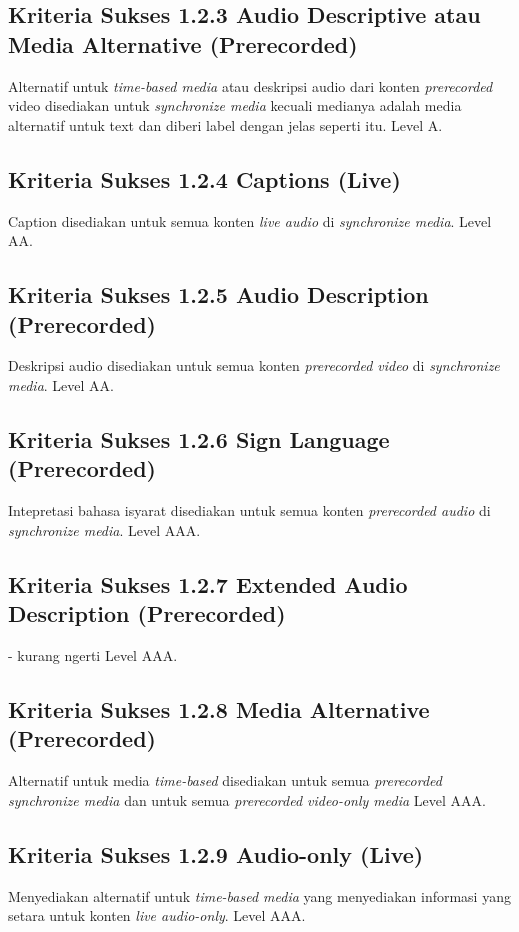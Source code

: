 \subsection{Kriteria Sukses 1.2.3 Audio Descriptive atau Media Alternative (Prerecorded)}
\label{sec:kriteria_1.2.3}
Alternatif untuk \textit{time-based media} atau deskripsi audio dari konten \textit{prerecorded} video disediakan untuk \textit{synchronize media} kecuali medianya adalah media alternatif untuk text dan diberi label dengan jelas seperti itu.
Level A.

\subsection{Kriteria Sukses 1.2.4 Captions (Live)}
\label{sec:kriteria_1.2.4}
Caption disediakan untuk semua konten \textit{live audio} di \textit{synchronize media}.
Level AA.

\subsection{Kriteria Sukses 1.2.5 Audio Description (Prerecorded)}
\label{sec:kriteria_1.2.5}
Deskripsi audio disediakan untuk semua konten \textit{prerecorded video} di \textit{synchronize media}.
Level AA.

\subsection{Kriteria Sukses 1.2.6 Sign Language (Prerecorded)}
\label{sec:kriteria_1.2.6}
Intepretasi bahasa isyarat disediakan untuk semua konten \textit{prerecorded audio} di \textit{synchronize media}.
Level AAA.

\subsection{Kriteria Sukses 1.2.7 Extended Audio Description (Prerecorded)}
\label{sec:kriteria_1.2.7}
- kurang ngerti
Level AAA.

\subsection{Kriteria Sukses 1.2.8 Media Alternative (Prerecorded)}
\label{sec:kriteria_1.2.8}
Alternatif untuk media \textit{time-based} disediakan untuk semua \textit{prerecorded synchronize media} dan untuk semua \textit{prerecorded video-only media}
Level AAA.

\subsection{Kriteria Sukses 1.2.9 Audio-only (Live)}
\label{sec:kriteria_1.2.9}
Menyediakan alternatif untuk \textit{time-based media} yang menyediakan informasi yang setara untuk konten \textit{live audio-only}.
Level AAA.

